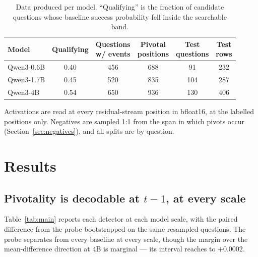 \documentclass{article}
\begin{document}
\begin{table}[t]
  \centering
  \caption{Data produced per model. ``Qualifying'' is the fraction of
  candidate questions whose baseline success probability fell inside the
  searchable band.}
  \label{tab:data}
  \normalsize
  \setlength{\tabcolsep}{4pt}
  \begin{tabular}{lccccc}
    \toprule
    Model & Qualifying & \shortstack{Questions\\w/ events} &
    \shortstack{Pivotal\\positions} & \shortstack{Test\\questions} &
    \shortstack{Test\\rows} \\
    \midrule
    Qwen3-0.6B & 0.40 & 456 & 688 & 91 & 232 \\
    Qwen3-1.7B & 0.45 & 520 & 835 & 104 & 287 \\
    Qwen3-4B & 0.54 & 650 & 936 & 130 & 406 \\
    \bottomrule
  \end{tabular}
\end{table}

Activations are read at every residual-stream position in bfloat16, at the
labelled positions only. Negatives are sampled 1:1 from the span in which
pivots occur (Section~\ref{sec:negatives}), and all splits are by question.

\section{Results}
\label{sec:results}

\subsection{Pivotality is decodable at $t-1$, at every scale}
\label{sec:main-result}

Table~\ref{tab:main} reports each detector at each model scale, with the
paired difference from the probe bootstrapped on the same resampled
questions. The probe separates from every baseline at every scale, though
the margin over the mean-difference direction at 4B is marginal --- its
interval reaches to $+0.0002$.
\end{document}
